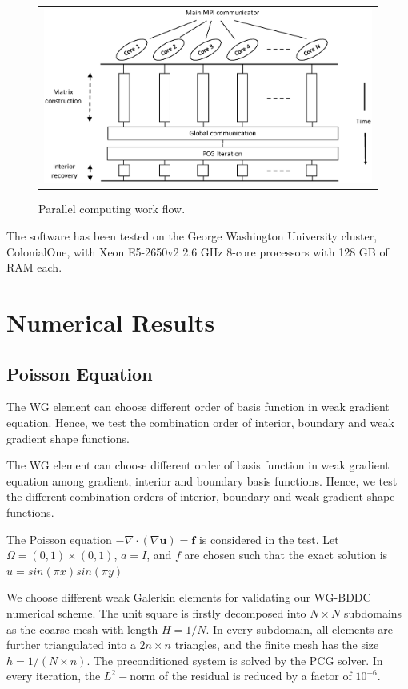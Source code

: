 \begin{figure}[h]
	\centering
	\begin{tabular}{c}
		\includegraphics[width=1.0\textwidth]{./pics/mpi_flow.eps}
	\end{tabular}
	\caption{\footnotesize Parallel computing work flow.}\label{fig6: mpi}
\end{figure}
The software has been tested on the George Washington University cluster, ColonialOne, with Xeon E5-2650v2 2.6 GHz 8-core processors with 128 GB of RAM each.

\section{Numerical Results}

\subsection{Poisson Equation}
The WG element can choose different order of basis function in weak gradient equation. Hence, we test the combination order of interior, boundary and weak gradient shape functions. 

The WG element can choose different order of basis function in weak gradient equation among gradient, interior and boundary basis functions. Hence, we test the different combination orders of interior, boundary and weak gradient shape functions. 

The Poisson equation $ -\nabla \cdot (\nabla \mathbf{u}) = \mathbf{f} $ is considered in the test. Let $ \Omega = (0, 1) \times (0, 1) $, $ a = I $, and $ f $ are chosen such that the exact solution is $ u = sin(\pi x) sin(\pi y) $

We choose different weak Galerkin elements for validating our WG-BDDC numerical scheme. The unit square is firstly decomposed into $ N \times N $ subdomains as the coarse mesh with length $ H = 1 / N $. In every subdomain, all elements are further triangulated into a $ 2 n \times n $ triangles, and the finite mesh has the size $ h = 1/(N\times n) $. The preconditioned system is solved by the PCG solver. In every iteration, the $ L^2- $norm of the residual is reduced by a factor of $ 10^{-6} $.

